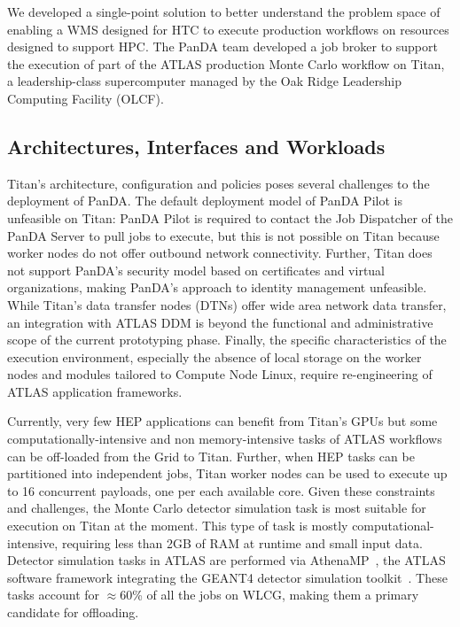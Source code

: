 We developed a single-point solution to better understand the problem space
of enabling a WMS designed for HTC to execute production workflows on
resources designed to support HPC\@. The PanDA team developed a job broker to
support the execution of part of the ATLAS production Monte Carlo workflow on
Titan, a leadership-class supercomputer managed by the Oak Ridge Leadership
Computing Facility (OLCF).

\subsection{Architectures, Interfaces and Workloads}\label{ssec:panda-titan}

Titan's architecture, configuration and policies poses several challenges to
the deployment of PanDA\@. The default deployment model of PanDA Pilot is
unfeasible on Titan: PanDA Pilot is required to contact the Job Dispatcher of
the PanDA Server to pull jobs to execute, but this is not possible on Titan
because worker nodes do not offer outbound network connectivity. Further,
Titan does not support PanDA's security model based on certificates and
virtual organizations, making PanDA's approach to identity management 
unfeasible. While Titan's data transfer nodes (DTNs) offer wide area network
data transfer, an integration with ATLAS DDM is beyond the functional and
administrative scope of the current prototyping phase. Finally, the specific
characteristics of the execution environment, especially the absence of local
storage on the worker nodes and modules tailored to Compute Node Linux,
require re-engineering of ATLAS application frameworks.

Currently, very few HEP applications can benefit from Titan's GPUs but some
computationally-intensive and non memory-intensive tasks of ATLAS workflows
can be off-loaded from the Grid to Titan. Further, when HEP tasks can be
partitioned into independent jobs, Titan worker nodes can be used to execute
up to 16 concurrent payloads, one per each available core. Given these
constraints and challenges, the  Monte Carlo detector simulation task is most
suitable for execution on Titan at the moment. This type of task is mostly
computational-intensive, requiring less than 2GB of RAM at runtime and small
input data. Detector simulation tasks in ATLAS are performed via
AthenaMP~\cite{aad2010atlas}, the ATLAS software framework integrating the
GEANT4 detector simulation toolkit~\cite{agostinelli2003geant4}. These tasks
account for \(\approx\)60\% of all the jobs on WLCG, making them a primary
candidate for offloading.

